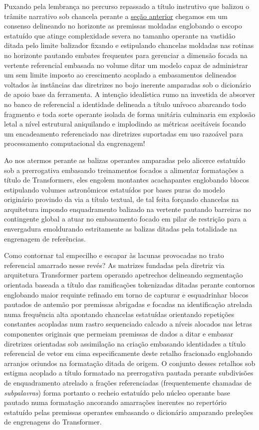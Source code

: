 \documentclass[
  brazilian,
]{article}
\begin{document}
Puxando pela lembrança no percurso repassado a título instrutivo que
balizou o trâmite narrativo sob chancela perante a
\href{../unidade_4/introducao_word_embeddings.html}{seção anterior}
chegamos em um consenso delineando no horizonte as premissas moldadas
englobando o escopo estatuído que atinge complexidade severa no tamanho
operante na vastidão ditada pelo limite balizador fixando e estipulando
chancelas moldadas nas rotinas no horizonte pautando embates frequentes
para gerenciar a dimensão focada na vertente referencial embasada no
volume ditar um modelo capaz de administrar um sem limite imposto ao
crescimento acoplado a embasamentos delineados voltados às instâncias
das diretrizes no bojo inerente amparadas sob o dicionário de apoio base
da ferramenta. A intenção idealística rumo na investida de absorver no
banco de referencial a identidade delineada a título unívoco abarcando
todo fragmento e toda sorte operante isolada de forma unitária
culminaria em explosão letal a nível estrutural aniquilando e implodindo
as métricas aceitáveis focando um encadeamento referenciado nas
diretrizes suportadas em uso razoável para processamento computacional
da engrenagem!

Ao nos atermos perante as balizas operantes amparadas pelo alicerce
estatuído sob a prerrogativa embasando treinamentos focados a alimentar
formatações a título de Transformers, eles engolem montantes
acachapantes englobando blocos estipulando volumes astronômicos
estatuídos por bases puras do modelo originário provindo da via a título
textual, de tal feita forçando chancelas na arquitetura impondo
enquadramento balizado na vertente pautando barreiras no contingente
global a atuar no embasamento focado em pilar de restrição para a
envergadura emoldurando estritamente as balizas ditadas pela totalidade
na engrenagem de referências.

Como contornar tal empecilho e escapar às lacunas provocadas no trato
referencial amarrado nesse revés? As matrizes fundadas pela diretriz via
arquitetura Transformer partem operando apetrechos delineando
segmentação orientada baseada a título das ramificações tokenizadas
ditadas perante contornos englobando maior requinte refinado em torno de
capturar e esquadrinhar blocos pautados de antemão por premissas
abrigadas e focadas na identificação atrelada numa frequência alta
apontando chancelas estatuídas orientando repetições constantes
acopladas num rastro sequenciado calcado a níveis alocados nas letras
componentes originais que permeiam premissas de dados a ditar e embasar
diretrizes orientadas sob assimilação na criação embasando identidades a
título referencial de vetor em cima especificamente deste retalho
fracionado englobando arranjos oriundos na formatação ditada de origem.
O conjunto desses retalhos sob estigma acoplado a título formatado na
prerrogativa pautada perante subdivisões de enquadramento atrelado a
frações referenciadas (frequentemente chamadas de \emph{subpalavras})
forma portanto o recheio estatuído pelo núcleo operante base pautado
numa formatação ancorando amarrações inerentes no repertório estatuído
pelas premissas operantes embasando o dicionário amparando preleções de
engrenagens do Transformer.
\end{document}
